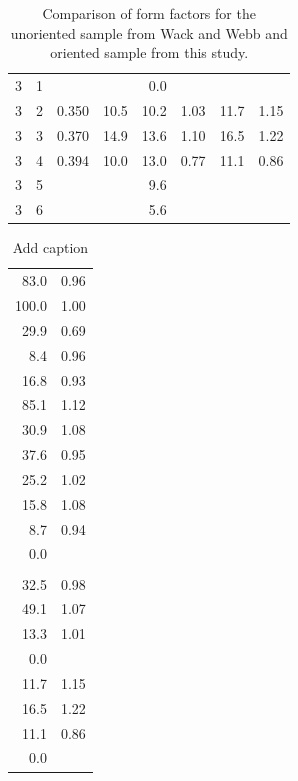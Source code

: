 \begin{table}[htbp]
\begin{tabular}{rrrrrrrr}
    3 &  1 &                      &       & 0.0   &      &       &      \\
    3 &  2 & 0.350                & 10.5  & 10.2  & 1.03 & 11.7  & 1.15 \\
    3 &  3 & 0.370                & 14.9  & 13.6  & 1.10 & 16.5  & 1.22 \\
    3 &  4 & 0.394                & 10.0  & 13.0  & 0.77 & 11.1  & 0.86 \\
    3 &  5 &                      &       & 9.6   &                     \\
    3 &  6 &                      &       & 5.6   &                     \\
    \hline
  \end{tabular}
  \caption{Comparison of form factors for the unoriented sample from Wack and Webb \cite{ref:Wack89}
  and oriented sample from this study.}
  \label{tab:cmu_vs_wack}
\end{table}

  \begin{table}[htbp]
    \centering
    \caption{Add caption}
      \begin{tabular}{rr}
      83.0  & 0.96 \\
      100.0 & 1.00 \\
      29.9  & 0.69 \\
      8.4   & 0.96 \\
      16.8  & 0.93 \\
      85.1  & 1.12 \\
      30.9  & 1.08 \\
      37.6  & 0.95 \\
      25.2  & 1.02 \\
      15.8  & 1.08 \\
      8.7   & 0.94 \\
      0.0   &      \\
            &      \\
      32.5  & 0.98 \\
      49.1  & 1.07 \\
      13.3  & 1.01 \\
      0.0   &      \\
      11.7  & 1.15 \\
      16.5  & 1.22 \\
      11.1  & 0.86 \\
      0.0   &      \\
      \end{tabular}%
    \label{tab:addlabel}%
  \end{table}%





